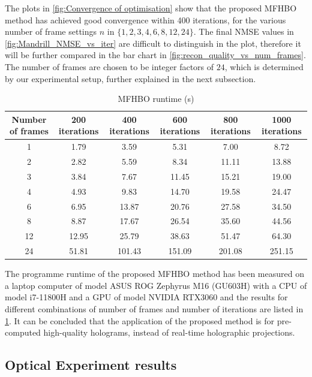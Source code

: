 	The plots in \cref{fig:Convergence of optimisation} show that the proposed MFHBO method has achieved good convergence within 400 iterations, for the various number of frame settings $n$ in $\{1, 2, 3, 4, 6, 8, 12, 24\}$. The final NMSE values in \cref{fig:Mandrill_NMSE_vs_iter} are difficult to distinguish in the plot, therefore it will be further compared in the bar chart in \cref{fig:recon_quality_vs_num_frames}. The number of frames are chosen to be integer factors of $24$, which is determined by our experimental setup, further explained in the next subsection.


	\begin{table}[H]
	\centering
	\begin{tabular}{|c|c|c|c|c|c|}
	\hline
	\textbf{Number of frames} & \textbf{200 iterations} & \textbf{400 iterations} & \textbf{600 iterations} & \textbf{800 iterations} & \textbf{1000 iterations} \\ \hline
	1 & 1.79 & 3.59 & 5.31 & 7.00 & 8.72 \\ \hline
	2 & 2.82 & 5.59 & 8.34 & 11.11 & 13.88 \\ \hline
	3 & 3.84 & 7.67 & 11.45 & 15.21 & 19.00 \\ \hline
	4 & 4.93 & 9.83 & 14.70 & 19.58 & 24.47 \\ \hline
	6 & 6.95 & 13.87 & 20.76 & 27.58 & 34.50 \\ \hline
	8 & 8.87 & 17.67 & 26.54 & 35.60 & 44.56 \\ \hline
	12 & 12.95 & 25.79 & 38.63 & 51.47 & 64.30 \\ \hline
	24 & 51.81 & 101.43 & 151.09 & 201.08 & 251.15 \\ \hline
	\end{tabular}
	\caption{MFHBO runtime (s)}
	\label{tab:MFHBO runtime}
	\end{table}

	The programme runtime of the proposed MFHBO method has been measured on a laptop computer of model ASUS ROG Zephyrus M16 (GU603H) with a CPU of model i7-11800H and a GPU of model NVIDIA RTX3060 and the results for different combinations of number of frames and number of iterations are listed in \cref{tab:MFHBO runtime}. It can be concluded that the application of the proposed method is for pre-computed high-quality holograms, instead of real-time holographic projections.



\subsection{Optical Experiment results}

